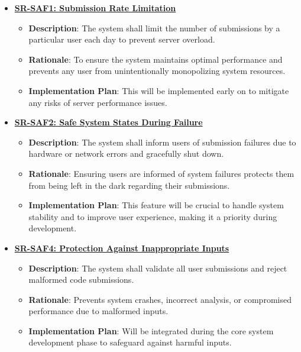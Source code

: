 \documentclass{article}
\begin{document}
\begin{itemize}
    \item \textbf{\hyperref[req:saf1]{SR-SAF1: Submission Rate Limitation}}
    \begin{itemize}
        \item \textbf{Description}: The system shall limit the number of submissions by a particular user each day to prevent server overload.
        \item \textbf{Rationale}: To ensure the system maintains optimal performance and prevents any user from unintentionally monopolizing system resources.
        \item \textbf{Implementation Plan}: This will be implemented early on to mitigate any risks of server performance issues.
    \end{itemize}

    \item \textbf{\hyperref[req:saf2]{SR-SAF2: Safe System States During Failure}}
    \begin{itemize}
        \item \textbf{Description}: The system shall inform users of submission failures due to hardware or network errors and gracefully shut down.
        \item \textbf{Rationale}: Ensuring users are informed of system failures protects them from being left in the dark regarding their submissions.
        \item \textbf{Implementation Plan}: This feature will be crucial to handle system stability and to improve user experience, making it a priority during development.
    \end{itemize}

    \item \textbf{\hyperref[req:saf4]{SR-SAF4: Protection Against Inappropriate Inputs}}
    \begin{itemize}
        \item \textbf{Description}: The system shall validate all user submissions and reject malformed code submissions.
        \item \textbf{Rationale}: Prevents system crashes, incorrect analysis, or compromised performance due to malformed inputs.
        \item \textbf{Implementation Plan}: Will be integrated during the core system development phase to safeguard against harmful inputs.
    \end{itemize}


\end{itemize}
\end{document}
